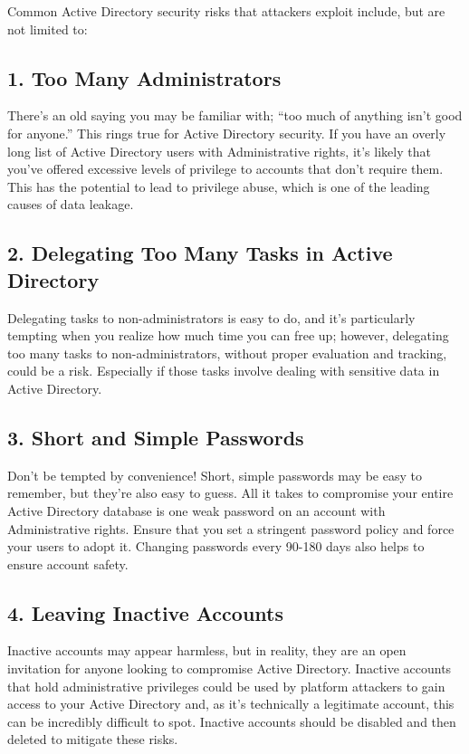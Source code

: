 Common Active Directory security risks that attackers exploit include, but are not limited to:

\subsection{1. Too Many Administrators}
There’s an old saying you may be familiar with; “too much of anything isn’t good for anyone.” This rings true for Active Directory security. If you have an overly long list of Active Directory users with Administrative rights, it’s likely that you’ve offered excessive levels of privilege to accounts that don’t require them. This has the potential to lead to privilege abuse, which is one of the leading causes of data leakage.

\subsection{2. Delegating Too Many Tasks in Active Directory}
Delegating tasks to non-administrators is easy to do, and it’s particularly tempting when you realize how much time you can free up; however, delegating too many tasks to non-administrators, without proper evaluation and tracking, could be a risk. Especially if those tasks involve dealing with sensitive data in Active Directory.

\subsection{3. Short and Simple Passwords}
Don’t be tempted by convenience! Short, simple passwords may be easy to remember, but they’re also easy to guess. All it takes to compromise your entire Active Directory database is one weak password on an account with Administrative rights. Ensure that you set a stringent password policy and force your users to adopt it. Changing passwords every 90-180 days also helps to ensure account safety.

\subsection{4. Leaving Inactive Accounts}
Inactive accounts may appear harmless, but in reality, they are an open invitation for anyone looking to compromise Active Directory. Inactive accounts that hold administrative privileges could be used by platform attackers to gain access to your Active Directory and, as it’s technically a legitimate account, this can be incredibly difficult to spot. Inactive accounts should be disabled and then deleted to mitigate these risks.

